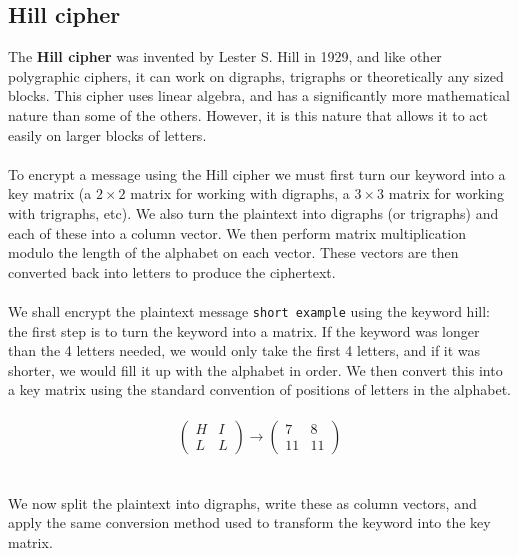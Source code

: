 \documentclass[Lau,binding=0.6cm,oneside]{sapthesis}
\begin{document}
\subsection{Hill cipher}
The \textbf{Hill cipher} was invented by Lester S. Hill in 1929, and like other polygraphic ciphers, it can work on digraphs, trigraphs or theoretically any sized blocks. This cipher uses linear algebra, and has a significantly more mathematical nature than some of the others\supercite{hill}. However, it is this nature that allows it to act easily on larger blocks of letters.\\\\
To encrypt a message using the Hill cipher we must first turn our keyword into a key matrix (a $2 \times 2$ matrix for working with digraphs, a $3 \times 3$ matrix for working with trigraphs, etc). We also turn the plaintext into digraphs (or trigraphs) and each of these into a column vector. We then perform matrix multiplication modulo the length of the alphabet on each vector. These vectors are then converted back into letters to produce the ciphertext.\\\\
We shall encrypt the plaintext message \colorbox{gray!12}{\small{\texttt{short example}}} using the keyword \textsf{hill}: the first step is to turn the keyword into a matrix. If the keyword was longer than the 4 letters needed, we would only take the first 4 letters, and if it was shorter, we would fill it up with the alphabet in order. We then convert this into a key matrix using the standard convention of positions of letters in the alphabet.\\\\
\begin{equation}
\begin{pmatrix}
	H & I \\
	L & L
\end{pmatrix}
\rightarrow
\begin{pmatrix}
	7 & 8\\
	11 & 11
\end{pmatrix}
\end{equation}
\ \\\\
We now split the plaintext into digraphs, write these as column vectors, and apply the same conversion method used to transform the keyword into the key matrix.\\\\
\end{document}
